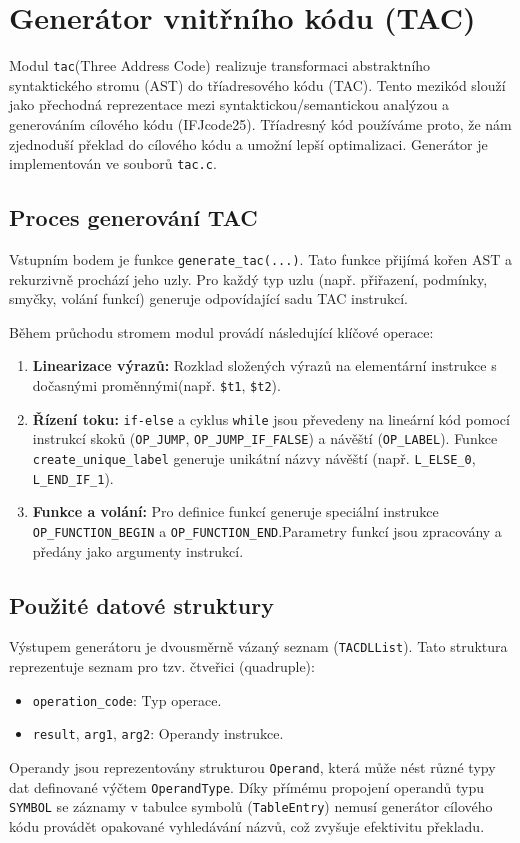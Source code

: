 \section{Generátor vnitřního kódu (TAC)}

Modul \texttt{tac}(Three Address Code) realizuje transformaci abstraktního syntaktického stromu (AST) do tříadresového kódu (TAC). Tento mezikód slouží jako přechodná reprezentace mezi syntaktickou/semantickou analýzou a generováním cílového kódu (IFJcode25). Tříadresný kód používáme proto, že nám zjednoduší překlad do cílového kódu a umožní lepší optimalizaci. Generátor je implementován ve souborů \texttt{tac.c}.


\subsection*{Proces generování TAC}

Vstupním bodem je funkce \texttt{generate\_tac(...)}. Tato funkce přijímá kořen AST a rekurzivně prochází jeho uzly. Pro každý typ uzlu (např. přiřazení, podmínky, smyčky, volání funkcí) generuje odpovídající sadu TAC instrukcí.

Během průchodu stromem modul provádí následující klíčové operace:
\begin{enumerate}
    \item \textbf{Linearizace výrazů:} Rozklad složených výrazů na elementární instrukce s dočasnými proměnnými(např. \texttt{\$t1}, \texttt{\$t2}).
    \item \textbf{Řízení toku:} \texttt{if-else} a cyklus \texttt{while} jsou převedeny na lineární kód pomocí instrukcí skoků (\texttt{OP\_JUMP}, \texttt{OP\_JUMP\_IF\_FALSE}) a návěští (\texttt{OP\_LABEL}). Funkce \texttt{create\_unique\_label} generuje unikátní názvy návěští (např. \texttt{L\_ELSE\_0}, \texttt{L\_END\_IF\_1}).
    \item \textbf{Funkce a volání:} Pro definice funkcí generuje speciální instrukce \texttt{OP\_FUNCTION\_BEGIN} a \texttt{OP\_FUNCTION\_END}.Parametry funkcí jsou zpracovány a předány jako argumenty instrukcí.
\end{enumerate}

\subsection*{Použité datové struktury}

Výstupem generátoru je dvousměrně vázaný seznam (\texttt{TACDLList}). Tato struktura reprezentuje seznam pro tzv. čtveřici (quadruple):
\begin{itemize}
    \item \texttt{operation\_code}: Typ operace.
    \item \texttt{result}, \texttt{arg1}, \texttt{arg2}: Operandy instrukce.
\end{itemize}

Operandy jsou reprezentovány strukturou \texttt{Operand}, která může nést různé typy dat definované výčtem \texttt{OperandType}. 
Díky přímému propojení operandů typu \texttt{SYMBOL} se záznamy v tabulce symbolů (\texttt{TableEntry}) nemusí generátor cílového kódu provádět opakované vyhledávání názvů, což zvyšuje efektivitu překladu.